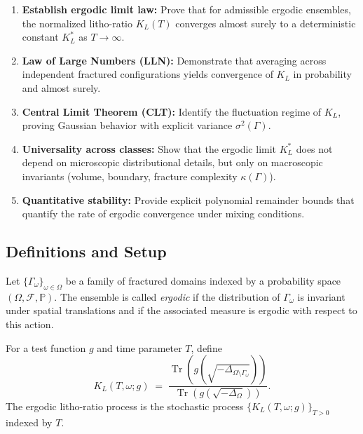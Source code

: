 \begin{enumerate}[label=\textbf{G\arabic*}, start=72]
    \item \textbf{Establish ergodic limit law:} Prove that for admissible ergodic
    ensembles, the normalized litho-ratio $K_L(T)$ converges almost surely to a
    deterministic constant $K_L^*$ as $T\to\infty$.
    \item \textbf{Law of Large Numbers (LLN):} Demonstrate that averaging across
    independent fractured configurations yields convergence of $K_L$ in probability
    and almost surely.
    \item \textbf{Central Limit Theorem (CLT):} Identify the fluctuation regime of
    $K_L$, proving Gaussian behavior with explicit variance $\sigma^2(\Gamma)$.
    \item \textbf{Universality across classes:} Show that the ergodic limit $K_L^*$
    does not depend on microscopic distributional details, but only on macroscopic
    invariants (volume, boundary, fracture complexity $\kappa(\Gamma)$).
    \item \textbf{Quantitative stability:} Provide explicit polynomial remainder
    bounds that quantify the rate of ergodic convergence under mixing conditions.
\end{enumerate}

\subsection*{Definitions and Setup}

\begin{definition}
Let $\{\Gamma_\omega\}_{\omega\in\Omega}$ be a family of fractured domains
indexed by a probability space $(\Omega,\mathcal{F},\mathbb{P})$. The ensemble
is called \emph{ergodic} if the distribution of $\Gamma_\omega$ is invariant
under spatial translations and if the associated measure is ergodic with respect
to this action.
\end{definition}

\begin{definition}
For a test function $g$ and time parameter $T$, define
\[
    K_L(T,\omega; g) \;=\;
    \frac{\operatorname{Tr}\left(g(\sqrt{-\Delta_{\Omega\setminus\Gamma_\omega}})\right)}
         {\operatorname{Tr}\left(g(\sqrt{-\Delta_\Omega})\right)}.
\]
The ergodic litho-ratio process is the stochastic process
$\{K_L(T,\omega; g)\}_{T>0}$ indexed by $T$.
\end{definition}

